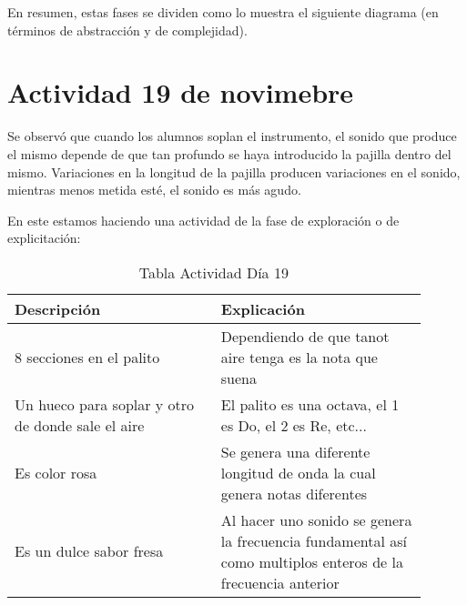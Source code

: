 \documentclass[12pt]{report}
\newcounter{it}
\theoremstyle{largebreak}
\begin{document}
    En resumen, estas fases se dividen como lo muestra el siguiente diagrama (en términos de abstracción y de complejidad).

    \section{Actividad 19 de novimebre}

    Se observó que cuando los alumnos soplan el instrumento, el sonido que produce el mismo depende de que tan profundo se haya introducido la pajilla dentro del mismo. Variaciones en la longitud de la pajilla producen variaciones en el sonido, mientras menos metida esté, el sonido es más agudo.

    En este estamos haciendo una actividad de la fase de exploración o de explicitación:

    \begin{table}[ht]
        \centering
        \begin{tabular}{p{0.45\linewidth} | p{0.45\linewidth}}
            Descripción & Explicación \\
            \hline
            8 secciones en el palito & Dependiendo de que tanot aire tenga es la nota que suena \\
            Un hueco para soplar y otro de donde sale el aire & El palito es una octava, el 1 es Do, el 2 es Re, etc...\\
            Es color rosa & Se genera una diferente longitud de onda la cual genera notas diferentes \\
            Es un dulce sabor fresa & Al hacer uno sonido se genera la frecuencia fundamental así como multiplos enteros de la frecuencia anterior \\
            
        \end{tabular}
        \caption{Tabla Actividad Día 19}
        \label{tab:my_label}
    \end{table}
\end{document}
